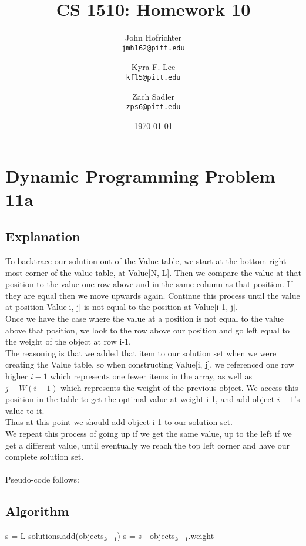 \documentclass[12pt]{article}
\title{CS 1510: Homework 10}
\author{
John Hofrichter\\\texttt{jmh162@pitt.edu}
\and
Kyra F. Lee \\\texttt{kfl5@pitt.edu}
\and
Zach Sadler \\\texttt{zps6@pitt.edu}}
\date{\today}
\begin{document}
\maketitle
\section*{Dynamic Programming Problem 11a}
	\subsection*{Explanation}

To backtrace our solution out of the Value table, we start at the bottom-right most corner of the value table, at Value[N, L]. Then we compare the value at that position to the value one row above and in the same column as that position. If they are equal then we move upwards again. Continue this process until the value at position Value[i, j] is not equal to the position at Value[i-1, j].\\
Once we have the case where the value at a position is not equal to the value above that position, we look to the row above our position and go left equal to the weight of the object at row i-1. \\
The reasoning is that we added that item to our solution set when we were creating the Value table, so when constructing Value[i, j], we referenced one row higher $i-1$ which represents one fewer items in the array, as well as   $j - W(i-1)$ which represents the weight of the previous object. We access this position in the table to get the optimal value at weight i-1, and add object $i-1$'s value to it. \\
Thus at this point we should add object i-1 to our solution set.\\
We repeat this process of going up if we get the same value, up to the left if we get a different value, until eventually we reach the top left corner and have our complete solution set.\\ 
\\
Pseudo-code follows:

	\subsection*{Algorithm}
	
	\begin{algorithmic}
		\STATE s = L
				\STATE solutions.add(objects$_{k-1}$)
				\STATE s = s - objects$_{k-1}$.weight
			\ENDIF
		\ENDFOR
	\end{algorithmic}
	
\end{document}

